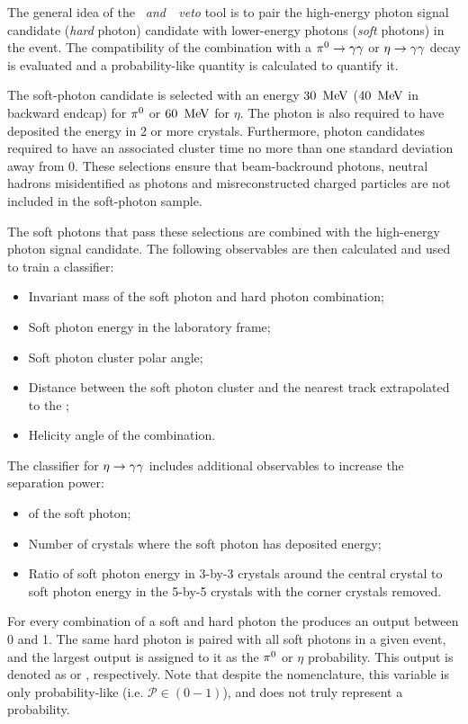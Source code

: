 The general idea of the \textit{\piz~and~\eta~veto} tool is to pair the high-energy photon signal candidate (\textit{hard} photon) candidate with lower-energy photons (\textit{soft} photons) in the event.
The compatibility of the combination with a $\pi^0\rightarrow\gamma\gamma$ or $\eta\rightarrow\gamma\gamma$ decay is evaluated and a probability-like quantity is calculated to quantify it.

The soft-photon candidate is selected with an energy $30~\mathrm{\,Me\kern -0.1em V}$ ($40~\mathrm{\,Me\kern -0.1em V}$ in backward \ECL endcap) for $\pi^0$ or $60~\mathrm{\,Me\kern -0.1em V}$ for $\eta$.
The photon is also required to have deposited the energy in 2 or more crystals.
Furthermore, photon candidates required to have an associated cluster time no more than one standard deviation away from 0.
These selections ensure that beam-backround photons, neutral hadrons misidentified as photons and misreconstructed charged particles are not included in the soft-photon sample.

The soft photons that pass these selections are combined with the high-energy photon signal candidate.
The following observables are then calculated and used to train a \MVA classifier:
\begin{itemize}
    \item Invariant mass of the soft photon and hard photon combination;
    \item Soft photon energy in the laboratory frame;
    \item Soft photon \ECL cluster polar angle;
    \item Distance between the soft photon \ECL cluster and the nearest track extrapolated to the \ECL;
    \item Helicity angle of the combination.
\end{itemize}
The classifier for $\eta\rightarrow\gamma\gamma$ includes additional observables to increase the separation power:
\begin{itemize}
    \item \ZMVA of the soft photon;
    \item Number of crystals where the soft photon has deposited energy;
    \item Ratio of soft photon energy in 3-by-3 crystals around the central crystal to soft photon energy in the 5-by-5 crystals with the corner crystals removed.
\end{itemize}
For every combination of a soft and hard photon the \MVA produces an output between 0 and 1.
The same hard photon is paired with all soft photons in a given event, and the largest \MVA output is assigned to it as the $\pi^0$ or $\eta$ probability.
This \MVA output is denoted as \piVeto or \etaVeto, respectively.
Note that despite the nomenclature, this variable is only probability-like (i.e. $\mathcal{P}\in(0-1)$), and does not truly represent a probability.

